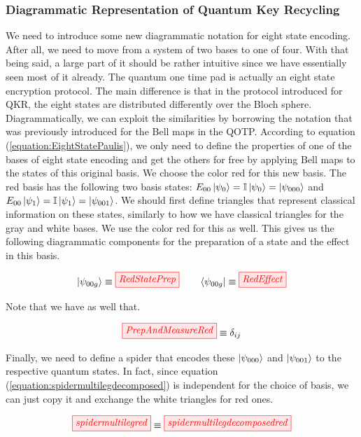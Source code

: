 \documentclass[]{article}
\begin{document}
\subsubsection{Diagrammatic Representation of Quantum Key Recycling}
We need to introduce some new diagrammatic notation for eight state encoding. After all, we need to move from a system of two bases to one of four. With that being said, a large part of it should be rather intuitive since we have essentially seen most of it already. The quantum one time pad is actually an eight state encryption protocol. The main difference is that in the protocol introduced for QKR, the eight states are distributed differently over the Bloch sphere. Diagrammatically, we can exploit the similarities by borrowing the notation that was previously introduced for the Bell maps in the QOTP. According to equation (\ref{equation:EightStatePaulis}), we only need to define the properties of one of the bases of eight state encoding and get the others for free by applying Bell maps to the states of this original basis. We choose the color red for this new basis. The red basis has the following two basis states: $E_{00}\ket{\psi_{0}} = \mathbb{I}\ket{\psi_{0}} = \ket{\psi_{000}}$ and $E_{00}\ket{\psi_{1}} = \mathbb{I}\ket{\psi_{1}} = \ket{\psi_{001}}$. We should first define triangles that represent classical information on these states, similarly to how we have classical triangles for the gray and white bases. We use the color red for this as well. This gives us the following diagrammatic components for the preparation of a state and the effect in this basis.

\begin{equation}
	\label{equation:newbases}
	\ket{\psi_{00g}} \equiv \tikzfig{RedStatePrep} ~~~~~~ \bra{\psi_{00g}} \equiv \tikzfig{RedEffect}
\end{equation}

Note that we have as well that.

\begin{equation}
\label{equation:RedMeasureAndEffect}
\tikzfig{PrepAndMeasureRed} \equiv \delta_{ij}
\end{equation}

Finally, we need to define a spider that encodes these $\ket{\psi_{000}}$ and $\ket{\psi_{001}}$ to the respective quantum states. In fact, since equation (\ref{equation:spidermultilegdecomposed}) is independent for the choice of basis, we can just copy it and exchange the white triangles for red ones.

\begin{equation}
	\label{equation:RedSpiderPrepareAndMeasure}
\tikzfig{spidermultilegred} \equiv \tikzfig{spidermultilegdecomposedred}
\end{equation}
\end{document}
